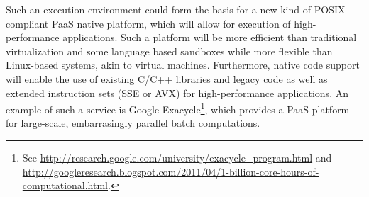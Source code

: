 

Such an execution environment could form the basis for a new kind of
POSIX compliant PaaS native platform, which will allow for execution of
high-performance applications. Such a platform will be more efficient
than traditional virtualization and some language based sandboxes while
more flexible than Linux-based systems, akin to virtual machines.
Furthermore, native code support will enable the use of existing C/C++
libraries and legacy code as well as extended instruction sets (\eg SSE
or AVX) for high-performance applications. An example of such a service
is Google Exacycle\footnote{See
\url{http://research.google.com/university/exacycle_program.html} and
\url{http://googleresearch.blogspot.com/2011/04/1-billion-core-hours-of-computational.html}.},
which provides a PaaS platform for large-scale, embarrasingly parallel
batch computations.


